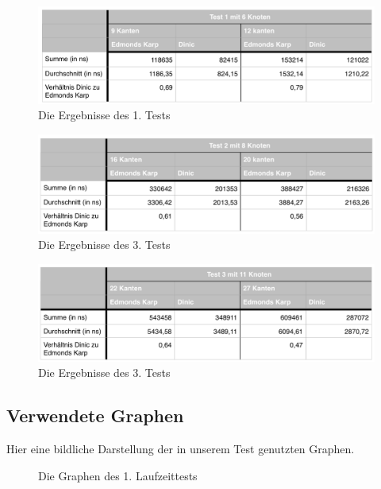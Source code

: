 \documentclass[a4paper]{llncs}
\begin{document}
\begin{figure}
\label{fig:testgraph1}
    \includegraphics[scale=0.55]{ergebnisse1} 
\caption{Die Ergebnisse des 1. Tests} 
\end{figure}
\begin{figure}
\label{fig:testgraph1}
    \includegraphics[scale=0.55]{ergebnisse2} 
\caption{Die Ergebnisse des 3. Tests} 
\end{figure}
\begin{figure}
\label{fig:testgraph1}
    \includegraphics[scale=0.55]{ergebnisse3} 
\caption{Die Ergebnisse des 3. Tests} 
\end{figure}

\subsection{Verwendete Graphen}
Hier eine bildliche Darstellung der in unserem Test genutzten Graphen.

\begin{figure}
\label{fig:testgraph1}
\caption{Die Graphen des 1. Laufzeittests} 
\end{figure}
\end{document}
